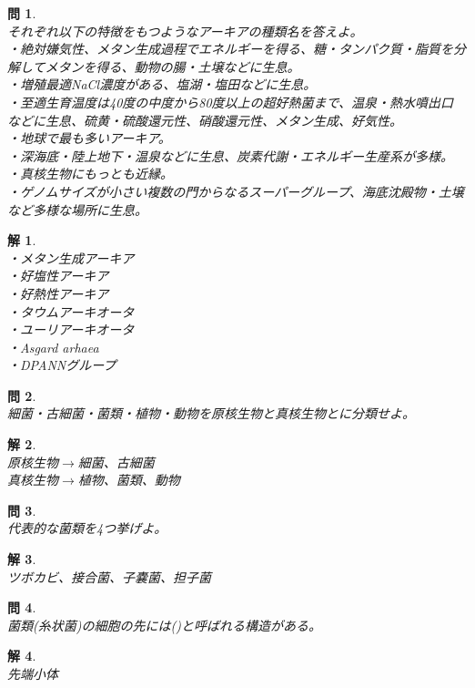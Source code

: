 \documentclass{jsarticle}
\newtheorem{pro}{問}[section]
\newtheorem{ans}{解}[section]
\begin{document}
\begin{pro}~\\
    それぞれ以下の特徴をもつようなアーキアの種類名を答えよ。\\
    ・絶対嫌気性、メタン生成過程でエネルギーを得る、糖・タンパク質・脂質を分解してメタンを得る、動物の腸・土壌などに生息。\\
    ・増殖最適NaCl濃度がある、塩湖・塩田などに生息。\\
    ・至適生育温度は40度の中度から80度以上の超好熱菌まで、温泉・熱水噴出口などに生息、硫黄・硫酸還元性、硝酸還元性、メタン生成、好気性。\\
    ・地球で最も多いアーキア。\\
    ・深海底・陸上地下・温泉などに生息、炭素代謝・エネルギー生産系が多様。\\
    ・真核生物にもっとも近縁。\\
    ・ゲノムサイズが小さい複数の門からなるスーパーグループ、海底沈殿物・土壌など多様な場所に生息。
\end{pro}
\begin{ans}~\\
    ・メタン生成アーキア\\
    ・好塩性アーキア\\
    ・好熱性アーキア\\
    ・タウムアーキオータ\\
    ・ユーリアーキオータ\\
    ・Asgard arhaea\\
    ・DPANNグループ
\end{ans}

\begin{pro}~\\
    細菌・古細菌・菌類・植物・動物を原核生物と真核生物とに分類せよ。
\end{pro}
\begin{ans}~\\
    原核生物\(\longrightarrow\)細菌、古細菌\\
    真核生物\(\longrightarrow\)植物、菌類、動物
\end{ans}

\begin{pro}~\\
    代表的な菌類を4つ挙げよ。
\end{pro}
\begin{ans}~\\
    ツボカビ、接合菌、子嚢菌、担子菌
\end{ans}

\begin{pro}~\\
    菌類(糸状菌)の細胞の先には(\hspace{5mm})と呼ばれる構造がある。
\end{pro}
\begin{ans}~\\
    先端小体
\end{ans}
\end{document}
